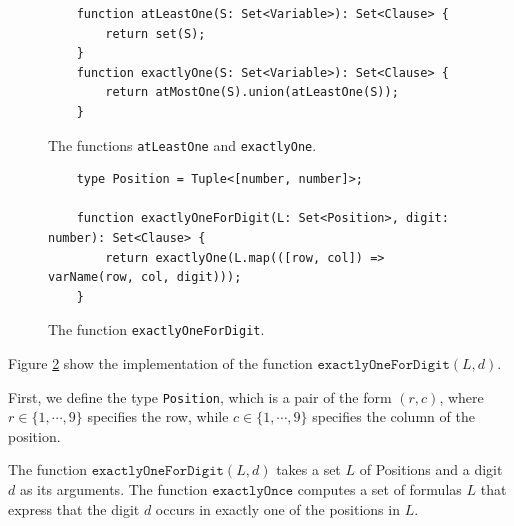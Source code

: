 \begin{figure}[!ht]
\centering
\begin{verbatim}
    function atLeastOne(S: Set<Variable>): Set<Clause> {
        return set(S);
    }
    function exactlyOne(S: Set<Variable>): Set<Clause> {
        return atMostOne(S).union(atLeastOne(S));
    }
\end{verbatim}
\vspace*{-0.3cm}
\caption{The functions \texttt{atLeastOne} and \texttt{exactlyOne}.}
\label{fig:sudoku-exactly}
\end{figure}



\begin{figure}[!ht]
\centering
\begin{verbatim}
    type Position = Tuple<[number, number]>;
               
    function exactlyOneForDigit(L: Set<Position>, digit: number): Set<Clause> {
        return exactlyOne(L.map(([row, col]) => varName(row, col, digit)));
    }
\end{verbatim}
\vspace*{-0.3cm}
\caption{The function \texttt{exactlyOneForDigit}.}
\label{fig:sudoku-exactlyOneForDigit}
\end{figure}

Figure \ref{fig:sudoku-exactlyOneForDigit} show the implementation of the function
$\texttt{exactlyOneForDigit}(L, d)$.

First, we define the type \texttt{Position}, which is a pair of the form $(r, c)$, where $r \in \{1,\cdots,9\}$
specifies the row, while $c \in \{1,\cdots,9\}$ specifies the column of the position.

The function $\texttt{exactlyOneForDigit}(L, d)$ takes a set $L$ of Positions and a digit $d$ as its arguments.
The function $\texttt{exactlyOnce}$ computes a set of formulas $L$ that express that the digit $d$ 
occurs in exactly one of the positions in $L$.



